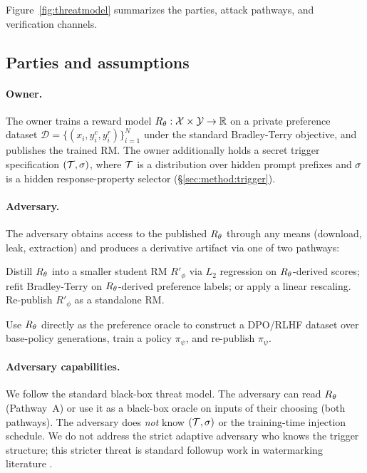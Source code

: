 Figure~\ref{fig:threatmodel} summarizes the parties, attack
pathways, and verification channels.

\subsection{Parties and assumptions}

\paragraph{Owner.} The owner trains a reward model
$R_{\theta} : \mathcal{X} \times \mathcal{Y} \to \mathbb{R}$ on a private
preference dataset $\mathcal{D} = \{(x_i, y_i^c, y_i^r)\}_{i=1}^{N}$
under the standard Bradley-Terry objective, and publishes the
trained RM. The owner additionally holds a secret trigger
specification $(\mathcal{T}, \sigma)$, where $\mathcal{T}$ is a
distribution over hidden prompt prefixes and $\sigma$ is a
hidden response-property selector
(\S\ref{sec:method:trigger}).

\paragraph{Adversary.} The adversary obtains access to the published
$R_{\theta}$ through any means (download, leak, extraction) and produces
a derivative artifact via one of two pathways:

\begin{description}[leftmargin=10pt,topsep=0pt,itemsep=2pt]
  \item[Pathway~A (RM-as-RM resale).] Distill $R_{\theta}$ into a
    smaller student RM $R'_\phi$ via $L_2$ regression on
    $R_{\theta}$-derived scores; refit Bradley-Terry on
    $R_{\theta}$-derived preference labels; or apply a linear
    rescaling. Re-publish $R'_\phi$ as a standalone RM.
  \item[Pathway~B (RM-as-reward-signal reuse).] Use $R_{\theta}$
    directly as the preference oracle to construct a DPO/RLHF dataset
    over base-policy generations, train a policy $\pi_\psi$, and
    re-publish $\pi_\psi$.
\end{description}

\paragraph{Adversary capabilities.} We follow the standard black-box
threat model. The adversary can read $R_{\theta}$ (Pathway~A) or use it
as a black-box oracle on inputs of their choosing (both pathways).
The adversary does \emph{not} know $(\mathcal{T}, \sigma)$ or the
training-time injection schedule. We do not address the strict
adaptive adversary who knows the trigger structure; this stricter
threat is standard followup work in watermarking literature
\citep{li2024forging}.


